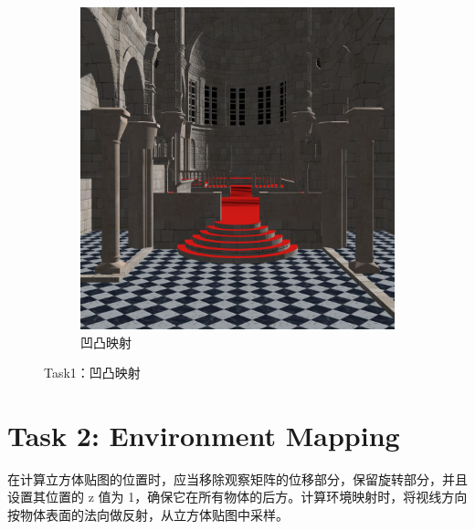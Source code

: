 \documentclass[UTF8]{ctexart}
\begin{document}
\begin{figure}[htbp]
\begin{subfigure}[b]{0.49\textwidth}
        \includegraphics[width=\textwidth]{images/1-4.png}
        \caption{凹凸映射}
    \end{subfigure}
    \caption*{Task1：凹凸映射}
\end{figure}

\section*{Task 2: Environment Mapping}

在计算立方体贴图的位置时，应当移除观察矩阵的位移部分，保留旋转部分，并且设置其位置的 z 值为 1，确保它在所有物体的后方。计算环境映射时，将视线方向按物体表面的法向做反射，从立方体贴图中采样。
\end{document}
